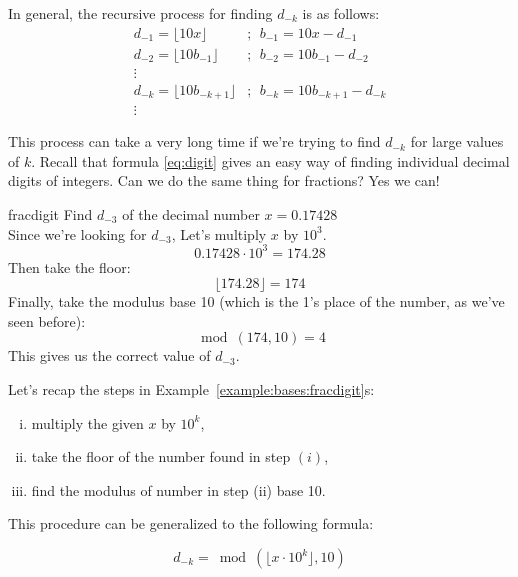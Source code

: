 In general, the recursive process for finding $d_{-k}$ is as follows:
\begin{equation}\label{eq:recursFrac}
\begin{aligned}
d_{-1}=\lfloor 10x\rfloor&;~~ b_{-1}=10x - d_{-1}\\
d_{-2}=\lfloor 10b_{-1}\rfloor&;~~ b_{-2}=10b_{-1} - d_{-2}\\
\vdots \\
d_{-k}=\lfloor 10b_{-k+1}\rfloor&;~~ b_{-k}=10b_{-k+1} - d_{-k}\\
\vdots
\end{aligned}
\end{equation}

This process can take a very long time if we're trying to find $d_{-k}$ for large values of $k$. Recall that formula \eqref{eq:digit} gives an easy way of finding individual decimal digits of integers. Can we do the same thing for fractions? Yes we can!

\begin{example}{fracdigit}
Find $d_{-3}$ of the decimal number $x=0.17428$\\
Since we're looking for $d_{-3}$, Let's multiply $x$ by $10^3$.\\
\begin{equation*}
0.17428\cdot 10^3=174.28
\end{equation*}
Then take the floor:
\begin{equation*}
\lfloor 174.28 \rfloor = 174
\end{equation*} 
Finally, take the modulus base 10 (which is the 1's place of the number, as we've seen before):
\begin{equation*}
\bmod(174,10)=4
\end{equation*}
 This gives us the correct value of $d_{-3}$.
\end{example}

Let's recap the steps in Example~\ref{example:bases:fracdigit}s:
\begin{enumerate}[(i)]
\item multiply the given $x$ by $10^k$,
\item take the floor of the number found in step $(i)$,
\item find the modulus of number in step (ii) base 10.
\end{enumerate}
This procedure can be generalized to the following formula:

\begin{equation}\label{eq:decdig}
d_{-k}=\bmod(\lfloor x\cdot 10^k\rfloor,10)
\end{equation}

